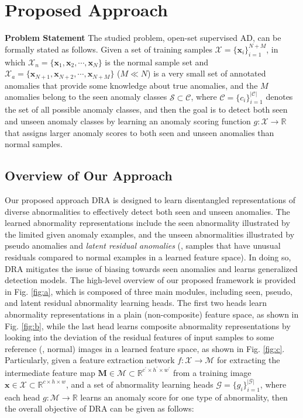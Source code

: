 \documentclass[10pt,twocolumn,letterpaper]{article}
\begin{document}
\section{Proposed Approach}


\textbf{Problem Statement}
The studied problem, open-set supervised AD, can be formally stated as follows.
Given a set of training samples $\mathcal{X}=\{ \mathbf{x}_{i}
\}_{i=1}^{N+M}$, in which $\mathcal{X}_{n}=\{ \mathbf{x}_{1}, \mathbf{x}_{2}, \cdots, \mathbf{x}_{N}\}$ is the normal sample set and $\mathcal{X}_{a}=\{\mathbf{x}_{N+1}, \mathbf{x}_{N+2}, \cdots, \mathbf{x}_{N+M} \}$ ($M\ll N$) is a very small set of annotated anomalies that provide some knowledge about true anomalies, and the $M$ anomalies belong to the seen anomaly classes $\mathcal{S}\subset\mathcal{C}$, where $\mathcal{C}=\{ c_i\}_{i=1}^{|\mathcal{C}|}$ denotes the set of all possible anomaly classes,
and then the goal is to detect both seen and unseen anomaly classes by learning an anomaly scoring function $g: \mathcal{X} \rightarrow \mathbb{R}$ that assigns larger anomaly scores to both seen and unseen anomalies than normal samples.

\subsection{Overview of Our Approach} \label{sec:4.1}
Our proposed approach DRA is designed
to learn disentangled representations of diverse abnormalities to effectively detect both seen and unseen anomalies.
The learned abnormality representations include the seen abnormality illustrated by the limited given anomaly examples, and the unseen abnormalities illustrated by pseudo anomalies and \textit{latent residual anomalies} (\ie, samples that have unusual residuals compared to normal examples in a learned feature space). In doing so, DRA mitigates the issue of biasing towards seen anomalies and learns generalized detection models. The high-level overview of our proposed framework is provided in Fig. \ref{fig:a}, which is composed of three main modules, including seen, pseudo, and latent residual abnormality learning heads. The first two heads learn abnormality representations in a plain (non-composite) feature space, as shown in Fig. \ref{fig:b}, while the last head learns composite abnormality representations by looking into the deviation of the residual features of input samples to some reference (\ie, normal) images in a learned feature space, as shown in Fig. \ref{fig:c}.
Particularly, given a feature extraction network $f: \mathcal{X} \rightarrow \mathcal{M}$ for extracting the intermediate feature map $\mathbf{M}\in \mathcal{M} \subset \mathbb{R}^{c^\prime\times h^\prime\times w^\prime}$ from a training image $\mathbf{x}\in \mathcal{X} \subset \mathbb{R}^{c\times h\times w}$, and a set of abnormality learning heads $\mathcal{G}=\{g_i\}^{|\mathcal{G}|}_{i=1}$, where each head $g:\mathcal{M}\rightarrow\mathbb{R}$ learns an anomaly score for one type of abnormality, then the overall objective of DRA can be given as follows:
\end{document}
